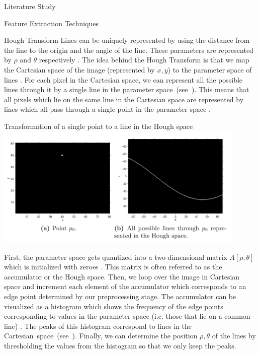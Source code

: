 \documentclass{matthijs}
\begin{document}
\begin{hoofdstuk}{Literature Study}
\begin{paragraaf}{Feature Extraction Techniques}
\begin{subparagraaf}{Hough Transform}
				Lines can be uniquely represented by using the distance from the line to the origin and the angle of the line.
				These parameters are represented by $\rho$ and $\theta$ respectively \cite{caltech2009line}.
				The idea behind the Hough Transform is that we map the Cartesian space of the image (represented by $x,y$) to the parameter space of lines \cite{solberg2009hough}.
				For each pixel in the Cartesian space, we can represent all the possible lines through it by a single line in the parameter \mbox{space (see ).}
				This means that all pixels which lie on the same line in the Cartesian space are represented by lines which all pass through a single point in the parameter space \cite{kahl2000hough}.

				\begin{figuur}{Transformation of a single point to a line in the Hough space}
					\includegraphics[width=0.9\textwidth]{caltech2009line-img1.png}
					\cite{caltech2009line}
				\end{figuur}

				\bigskip

				First, the parameter space gets quantized into a two-dimensional matrix $ A[\rho,\theta] $ which is initialized with zeroes \cite{solberg2009hough}.
				This matrix is often referred to as the accumulator or the Hough space.
				Then, we loop over the image in Cartesian space and increment each element of the accumulator which corresponds to an edge point determined by our preprocessing stage.
				The accumulator can be visualized as a histogram which shows the frequency of the edge points corresponding to values in the parameter space (i.e. those that lie on a common line) \cite{kahl2000hough}.
				The peaks of this histogram correspond to lines in the \mbox{Cartesian space (see ).}
				Finally, we can determine the position $\rho,\theta$ of the lines by thresholding the values from the histogram so that we only keep the peaks.


\end{subparagraaf}
\end{paragraaf}
\end{hoofdstuk}
\end{document}
